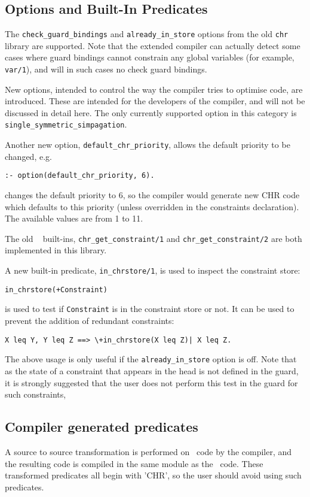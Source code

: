 \subsection{Options and Built-In Predicates}

The \verb'check_guard_bindings' and \verb'already_in_store' options from
the old {\tt chr} library are supported. Note that the extended compiler can
actually detect some cases where guard bindings cannot constrain any global
variables (for example, \verb'var/1'), and will in such cases no check 
guard bindings.

New options, intended to control the way the compiler tries to optimise
code, are introduced. These are intended for the developers of the compiler,
and will not be discussed in detail here. The only currently supported 
option in this category is \verb'single_symmetric_simpagation'.

Another new option, \verb'default_chr_priority', allows the default
priority to be changed, e.g.

\begin{verbatim}
:- option(default_chr_priority, 6).
\end{verbatim}

\noindent
changes the default priority to 6, so the compiler would generate new CHR
code which defaults to this priority (unless overridden in the constraints
declaration). The available values are from 1 to 11.

The old {\chr\ } built-ins, \verb'chr_get_constraint/1' and
\verb'chr_get_constraint/2' are both implemented in this library.

A new built-in predicate, \verb'in_chrstore/1', is used to inspect the
constraint store:

\begin{verbatim}
in_chrstore(+Constraint)
\end{verbatim}

\noindent
is used to test if \verb'Constraint' is in the constraint store or not. It
can be used to prevent the addition of redundant constraints:

\begin{verbatim}
X leq Y, Y leq Z ==> \+in_chrstore(X leq Z)| X leq Z.
\end{verbatim}

The above usage is only useful if the \verb'already_in_store' option is
off. Note that as the state of a constraint that appears in the head is
not defined in the guard, it is strongly suggested that the user does not
perform this test in the guard for such constraints,

\subsection{Compiler generated predicates}

A source to source transformation is performed on \chr\  code by the compiler,
and the resulting code is compiled in the same module as the \chr\  code. These
transformed predicates all begin with 'CHR', so the user should avoid using
such predicates. 






